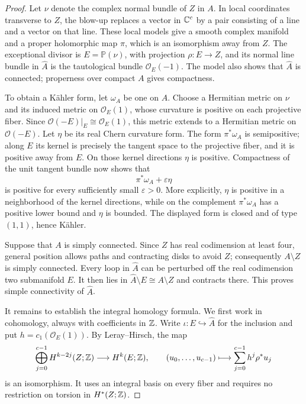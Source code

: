 \begin{proof}
Let $\nu$ denote the complex normal bundle of $Z$ in $A$. In local
coordinates transverse to $Z$, the blow-up replaces a vector in
$\mathbb C^c$ by a pair consisting of a line and a vector on that line.
These local models give a smooth complex manifold and a proper
holomorphic map $\pi$, which is an isomorphism away from $Z$. The
exceptional divisor is $E=\mathbb P(\nu)$, with projection
$\rho:E\to Z$, and its normal line bundle in $\widehat A$ is the
tautological bundle $\mathcal O_E(-1)$. The model also shows that
$\widehat A$ is connected; properness over compact $A$ gives
compactness.

To obtain a K\"ahler form, let $\omega_A$ be one on $A$. Choose a
Hermitian metric on $\nu$ and its induced metric on
$\mathcal O_E(1)$, whose curvature is positive on each projective
fiber. Since
$\mathcal O(-E)|_E\cong\mathcal O_E(1)$, this metric extends to a
Hermitian metric on $\mathcal O(-E)$. Let $\eta$ be its real Chern
curvature form. The form $\pi^*\omega_A$ is semipositive; along $E$
its kernel is precisely the tangent space to the projective fiber,
and it is positive away from $E$. On those kernel directions $\eta$
is positive. Compactness of the unit tangent bundle now shows that
\[
 \pi^*\omega_A+\varepsilon\eta
\]
is positive for every sufficiently small $\varepsilon>0$. More
explicitly, $\eta$ is positive in a neighborhood of the kernel
directions, while on the complement $\pi^*\omega_A$ has a positive
lower bound and $\eta$ is bounded. The displayed form is closed and
of type $(1,1)$, hence K\"ahler.

Suppose that $A$ is simply connected. Since $Z$ has real codimension
at least four, general position allows paths and contracting disks
to avoid $Z$; consequently $A\setminus Z$ is simply connected.
Every loop in $\widehat A$ can be perturbed off the real codimension
two submanifold $E$. It then lies in
$\widehat A\setminus E\cong A\setminus Z$ and contracts there.
This proves simple connectivity of $\widehat A$.

It remains to establish the integral homology formula. We first work
in cohomology, always with coefficients in $\mathbb Z$. Write
$\iota:E\hookrightarrow\widehat A$ for the inclusion and put
$h=c_1(\mathcal O_E(1))$. By Leray--Hirsch, the map
\[
 \bigoplus_{j=0}^{c-1}H^{k-2j}(Z;\mathbb Z)
 \longrightarrow H^k(E;\mathbb Z),\qquad
 (u_0,\ldots,u_{c-1})\longmapsto
 \sum_{j=0}^{c-1}h^j\rho^*u_j
\]
is an isomorphism. It uses an integral basis on every fiber and
requires no restriction on torsion in $H^*(Z;\mathbb Z)$.


\end{proof}
